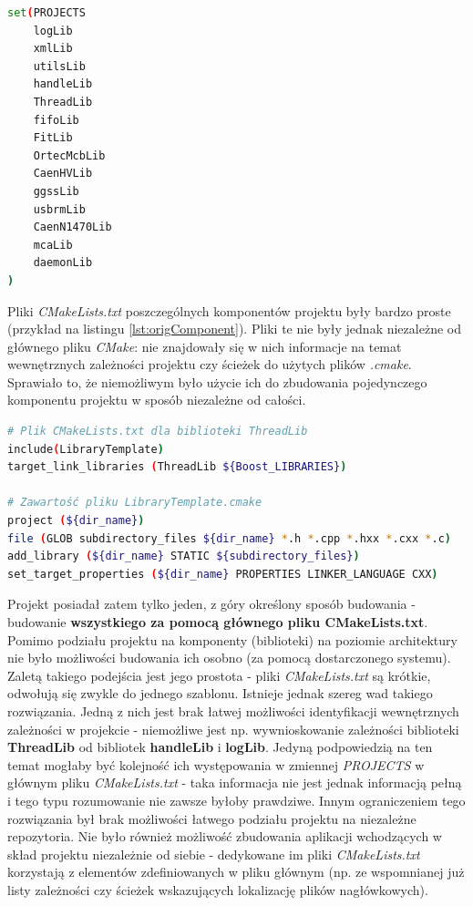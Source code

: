 \begin{lstlisting}[language=bash, caption={Fragment oryginalnego pliku \textit{CMakeLists.txt} znajdującego się w katalogu głównym pierwotnej wersji projektu przedstawiający zmienną \textit{PROJECTS} zawierającą listę bibliotek \cite{PluteckiMgr}}, label={lst:orig}]
set(PROJECTS
    logLib
    xmlLib
    utilsLib
    handleLib
    ThreadLib
    fifoLib
    FitLib
    OrtecMcbLib
    CaenHVLib
    ggssLib
    usbrmLib
    CaenN1470Lib
    mcaLib
    daemonLib
)
\end{lstlisting}

Pliki \textit{CMakeLists.txt} poszczególnych komponentów projektu były bardzo proste (przykład na listingu \ref{lst:origComponent}). Pliki te nie były jednak niezależne od głównego pliku \textit{CMake}: nie znajdowały się w nich informacje na temat wewnętrznych zależności projektu czy ścieżek do użytych plików \textit{.cmake}. Sprawiało to, że niemożliwym było użycie ich do zbudowania pojedynczego komponentu projektu w sposób niezależne od całości. 

\begin{lstlisting}[language=bash, caption={Oryginalny pliku \textit{CMakeLists.txt} służący do budowania biblioteki \textit{ThreadLib} oraz zawartość pliku \textit{LibraryTemplate.cmake} \cite{PluteckiMgr}}, label={lst:origComponent}]
# Plik CMakeLists.txt dla biblioteki ThreadLib
include(LibraryTemplate)
target_link_libraries (ThreadLib ${Boost_LIBRARIES})

# Zawartość pliku LibraryTemplate.cmake
project (${dir_name})
file (GLOB subdirectory_files ${dir_name} *.h *.cpp *.hxx *.cxx *.c)
add_library (${dir_name} STATIC ${subdirectory_files})
set_target_properties (${dir_name} PROPERTIES LINKER_LANGUAGE CXX)
\end{lstlisting}

Projekt posiadał zatem tylko jeden, z góry określony sposób budowania - budowanie \textbf{wszystkiego za pomocą głównego pliku CMakeLists.txt}. Pomimo podziału projektu na komponenty (biblioteki) na poziomie architektury nie było możliwości budowania ich osobno (za pomocą dostarczonego systemu). Zaletą takiego podejścia jest jego prostota - pliki \textit{CMakeLists.txt} są krótkie, odwołują się zwykle do jednego szablonu. Istnieje jednak szereg wad takiego rozwiązania. Jedną z nich jest brak łatwej możliwości identyfikacji wewnętrznych zależności w projekcie - niemożliwe jest np. wywnioskowanie zależności biblioteki \textbf{ThreadLib} od bibliotek \textbf{handleLib} i \textbf{logLib}. Jedyną podpowiedzią na ten temat mogłaby być kolejność ich występowania w zmiennej \textit{PROJECTS} w głównym pliku \textit{CMakeLists.txt} - taka informacja nie jest jednak informacją pełną i tego typu rozumowanie nie zawsze byłoby prawdziwe. Innym ograniczeniem tego rozwiązania był brak możliwości łatwego podziału projektu na niezależne repozytoria. Nie było również możliwość zbudowania aplikacji wchodzących w skład projektu niezależnie od siebie - dedykowane im pliki \textit{CMakeLists.txt} korzystają z elementów zdefiniowanych w pliku głównym (np. ze wspomnianej już listy zależności czy ścieżek wskazujących lokalizację plików nagłówkowych). 

